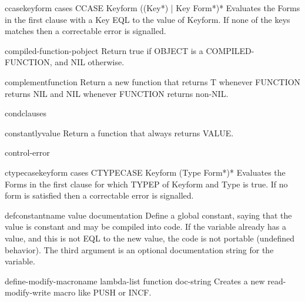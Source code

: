 \begin{macro}{ccase}{keyform \body cases}{}
  CCASE Keyform {({(Key*) | Key} Form*)}*
  Evaluates the Forms in the first clause with a Key EQL to the value of
  Keyform. If none of the keys matches then a correctable error is
  signalled.
\end{macro}

\begin{function}{compiled-function-p}{object}{}
  Return true if OBJECT is a COMPILED-FUNCTION, and NIL otherwise.
\end{function}

\begin{function}{complement}{function}{}
  Return a new function that returns T whenever FUNCTION returns NIL and
   NIL whenever FUNCTION returns non-NIL.
\end{function}

\begin{macro}{cond}{\rest clauses}{}
  
\end{macro}

\begin{function}{constantly}{value}{}
  Return a function that always returns VALUE.
\end{function}

\begin{condition-type}{control-error}{}{}
  
\end{condition-type}

\begin{macro}{ctypecase}{keyform \body cases}{}
  CTYPECASE Keyform {(Type Form*)}*
  Evaluates the Forms in the first clause for which TYPEP of Keyform and Type
  is true. If no form is satisfied then a correctable error is signalled.
\end{macro}

\begin{macro}{defconstant}{name value \op documentation}{}
  Define a global constant, saying that the value is constant and may be
  compiled into code. If the variable already has a value, and this is not
  EQL to the new value, the code is not portable (undefined behavior). The
  third argument is an optional documentation string for the variable.
\end{macro}

\begin{macro}{define-modify-macro}{name lambda-list function \op doc-string}{}
  Creates a new read-modify-write macro like PUSH or INCF.
\end{macro}

